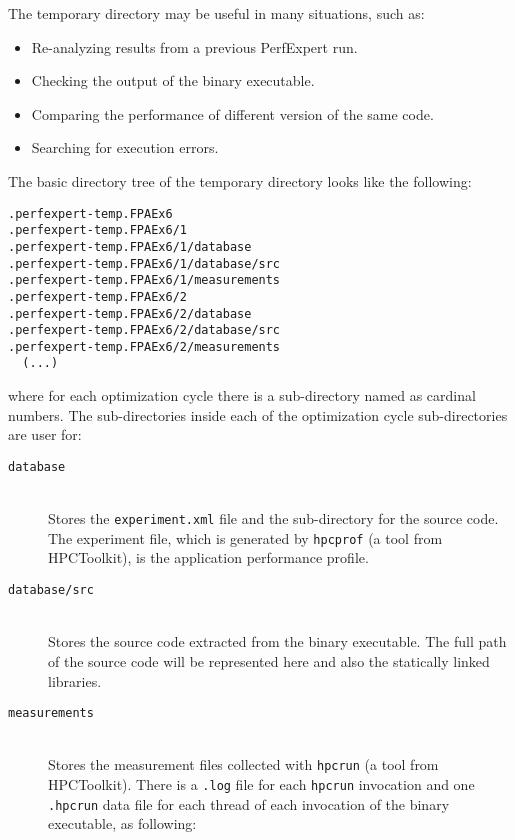 The temporary directory may be useful in many situations, such as:

\begin{itemize}
	\item Re-analyzing results from a previous PerfExpert run.
	\item Checking the output of the binary executable.
	\item Comparing the performance of different version of the same code.
	\item Searching for execution errors.
\end{itemize}

The basic directory tree of the temporary directory looks like the following:

\begin{lstlisting}[breaklines]
.perfexpert-temp.FPAEx6
.perfexpert-temp.FPAEx6/1
.perfexpert-temp.FPAEx6/1/database
.perfexpert-temp.FPAEx6/1/database/src
.perfexpert-temp.FPAEx6/1/measurements
.perfexpert-temp.FPAEx6/2
.perfexpert-temp.FPAEx6/2/database
.perfexpert-temp.FPAEx6/2/database/src
.perfexpert-temp.FPAEx6/2/measurements
  (...)
\end{lstlisting}

\noindent where for each optimization cycle there is a sub-directory named as cardinal numbers. The sub-directories inside each of the optimization cycle sub-directories are user for:

\begin{description}
	\item[\texttt{database}]\hfill \\
	Stores the \texttt{experiment.xml} file and the sub-directory for the source code. The experiment file, which is generated by \texttt{hpcprof} (a tool from HPCToolkit), is the application performance profile.

	\item[\texttt{database/src}]\hfill \\
	Stores the source code extracted from the binary executable. The full path of the source code will be represented here and also the statically linked libraries.

	\item[\texttt{measurements}]\hfill \\
	Stores the measurement files collected with \texttt{hpcrun} (a tool from HPCToolkit). There is a \texttt{.log} file for each \texttt{hpcrun} invocation and one \texttt{.hpcrun} data file for each thread of each invocation of the binary executable, as following:
\end{description}

